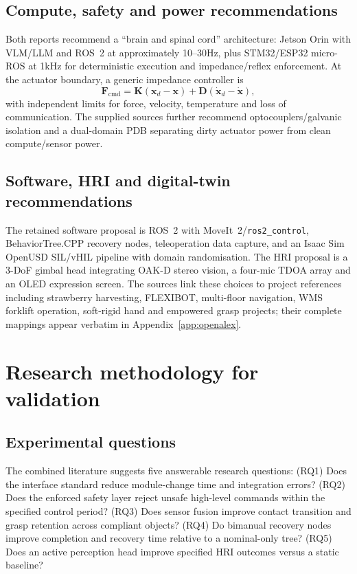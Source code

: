 \documentclass[10pt,a4paper]{article}
\begin{document}
\subsection{Compute, safety and power recommendations}
Both reports recommend a ``brain and spinal cord'' architecture: Jetson Orin with VLM/LLM and ROS~2 at approximately 10--30Hz, plus STM32/ESP32 micro-ROS at 1kHz for deterministic execution and impedance/reflex enforcement. At the actuator boundary, a generic impedance controller is
\begin{equation}
\mathbf{F}_{\mathrm{cmd}}=\mathbf{K}(\mathbf{x}_d-\mathbf{x})+\mathbf{D}(\dot{\mathbf{x}}_d-\dot{\mathbf{x}}),
\end{equation}
with independent limits for force, velocity, temperature and loss of communication. The supplied sources further recommend optocouplers/galvanic isolation and a dual-domain PDB separating dirty actuator power from clean compute/sensor power.

\subsection{Software, HRI and digital-twin recommendations}
The retained software proposal is ROS~2 with MoveIt~2/\texttt{ros2\_control}, BehaviorTree.CPP recovery nodes, teleoperation data capture, and an Isaac Sim OpenUSD SIL/vHIL pipeline with domain randomisation. The HRI proposal is a 3-DoF gimbal head integrating OAK-D stereo vision, a four-mic TDOA array and an OLED expression screen. The sources link these choices to project references including strawberry harvesting, FLEXIBOT, multi-floor navigation, WMS forklift operation, soft-rigid hand and empowered grasp projects; their complete mappings appear verbatim in Appendix~\ref{app:openalex}.

\section{Research methodology for validation}
\subsection{Experimental questions}
The combined literature suggests five answerable research questions: (RQ1) Does the interface standard reduce module-change time and integration errors? (RQ2) Does the enforced safety layer reject unsafe high-level commands within the specified control period? (RQ3) Does sensor fusion improve contact transition and grasp retention across compliant objects? (RQ4) Do bimanual recovery nodes improve completion and recovery time relative to a nominal-only tree? (RQ5) Does an active perception head improve specified HRI outcomes versus a static baseline?
\end{document}
